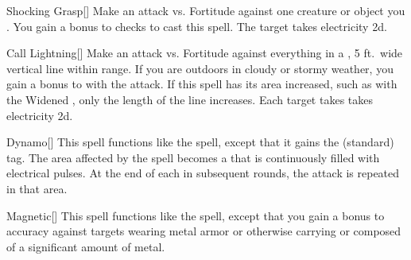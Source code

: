\lowercase{\hypertarget{spell:Shocking Grasp}{}}\label{spell:Shocking Grasp}
\begin{apability}[\nth{1}]{\hypertarget{spell:Shocking Grasp}{Shocking Grasp}}[]
Make an attack vs. Fortitude against one creature or object you .
You gain a  bonus to  checks to cast this spell.
\hit The target takes electricity  \plus2d.
\end{apability}
\vspace{0.25em}



\lowercase{\hypertarget{spell:Call Lightning}{}}\label{spell:Call Lightning}
\begin{apability}[\nth{2}]{\hypertarget{spell:Call Lightning}{Call Lightning}}[]
Make an attack vs. Fortitude against everything in a \arealarge, 5 ft.\ wide vertical line within \rngmed range.
If you are outdoors in cloudy or stormy weather, you gain a  bonus to  with the attack.
If this spell has its area increased, such as with the Widened , only the length of the line increases.
\hit Each target takes takes electricity  \plus2d.
\end{apability}
\vspace{0.25em}



\lowercase{\hypertarget{spell:Dynamo}{}}\label{spell:Dynamo}
\begin{apability}[\nth{2}]{\hypertarget{spell:Dynamo}{Dynamo}}[]
This spell functions like the  spell, except that it gains the  (standard) tag.
The area affected by the spell becomes a  that is continuously filled with electrical pulses.
At the end of each  in subsequent rounds, the attack is repeated in that area.
\end{apability}
\vspace{0.25em}



\lowercase{\hypertarget{spell:Magnetic}{}}\label{spell:Magnetic}
\begin{apability}[\nth{2}]{\hypertarget{spell:Magnetic}{Magnetic}}[]
This spell functions like the  spell, except that you gain a  bonus to accuracy against targets wearing metal armor or otherwise carrying or composed of a significant amount of metal.
\end{apability}
\vspace{0.25em}



